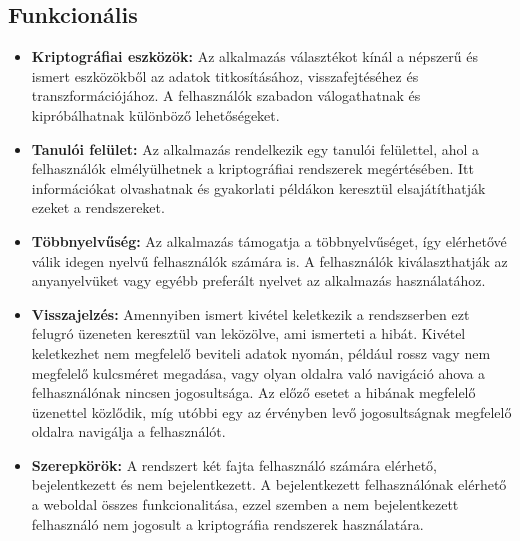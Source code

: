 \subsection{Funkcionális}

\begin{itemize}
	\item\textbf{Kriptográfiai eszközök:} Az alkalmazás választékot kínál a népszerű és ismert eszközökből az adatok titkosításához, visszafejtéséhez és transzformációjához. A felhasználók szabadon válogathatnak és kipróbálhatnak különböző lehetőségeket.

	\item\textbf{Tanulói felület:} Az alkalmazás rendelkezik egy tanulói felülettel, ahol a felhasználók elmélyülhetnek a kriptográfiai rendszerek megértésében. Itt információkat olvashatnak és gyakorlati példákon keresztül elsajátíthatják ezeket a rendszereket.

	\item\textbf{Többnyelvűség:} Az alkalmazás támogatja a többnyelvűséget, így elérhetővé válik idegen nyelvű felhasználók számára is. A felhasználók kiválaszthatják az anyanyelvüket vagy egyébb preferált nyelvet az alkalmazás használatához.

	\item\textbf{Visszajelzés:} Amennyiben ismert kivétel keletkezik a rendszserben ezt felugró üzeneten keresztül van leközölve, ami ismerteti a hibát. Kivétel keletkezhet nem megfelelő beviteli adatok nyomán, például rossz vagy nem megfelelő kulcsméret megadása, vagy olyan oldalra való navigáció ahova a felhasználónak nincsen jogosultsága. Az előző esetet a hibának megfelelő üzenettel közlődik, míg utóbbi egy az érvényben levő jogosultságnak megfelelő oldalra navigálja a felhasználót.

	\item\textbf{Szerepkörök:} A rendszert két fajta felhasználó számára elérhető, bejelentkezett és nem bejelentkezett. A bejelentkezett felhasználónak elérhető a weboldal összes funkcionalitása, ezzel szemben a nem bejelentkezett felhasználó nem jogosult a kriptográfia rendszerek használatára.
\end{itemize}

